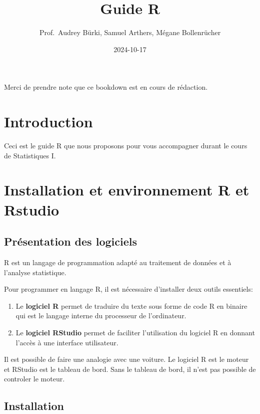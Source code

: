 \documentclass[
]{book}
\title{Guide R}
\author{Prof.~Audrey Bürki, Samuel Arthers, Mégane Bollenrücher}
\date{2024-10-17}
\providecommand{\tightlist}{%
  \setlength{\itemsep}{0pt}\setlength{\parskip}{0pt}}
\begin{document}
\maketitle

{
\setcounter{tocdepth}{1}
\tableofcontents
}
Merci de prendre note que ce bookdown est en cours de rédaction.

\chapter{Introduction}\label{introduction}

Ceci est le guide R que nous proposons pour vous accompagner durant le cours de Statistiques I.

\chapter{Installation et environnement R et Rstudio}\label{installation-et-environnement-r-et-rstudio}

\section{Présentation des logiciels}\label{pruxe9sentation-des-logiciels}

R est un langage de programmation adapté au traitement de données et à l'analyse statistique.

Pour programmer en langage R, il est nécessaire d'installer deux outils essentiels:

\begin{enumerate}
\def\labelenumi{\arabic{enumi}.}
\tightlist
\item
  Le \textbf{logiciel R} permet de traduire du texte sous forme de code R en binaire qui est le langage interne du processeur de l'ordinateur.
\item
  Le \textbf{logiciel RStudio} permet de faciliter l'utilisation du logiciel R en donnant l'accès à une interface utilisateur.
\end{enumerate}

Il est possible de faire une analogie avec une voiture. Le logiciel R est le moteur et RStudio est le tableau de bord. Sans le tableau de bord, il n'est pas possible de controler le moteur.

\section{Installation}\label{installation}
\end{document}
